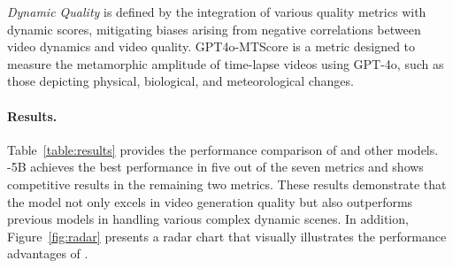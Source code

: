 \emph{Dynamic Quality} is defined by the integration of various quality metrics with dynamic scores, mitigating biases arising from negative correlations between video dynamics and video quality.
GPT4o-MTScore is a metric designed to measure the metamorphic amplitude of time-lapse videos using GPT-4o, such as those depicting physical, biological, and meteorological changes. 



\paragraph{Results.} 
Table~\ref{table:results} provides the performance comparison of \model and other models. 
\model-5B achieves the best performance in five out of the seven metrics and shows competitive results in the remaining two metrics. 
These results demonstrate that the model not only excels in video generation quality but also outperforms previous models in handling various complex dynamic scenes. 
In addition, Figure~\ref{fig:radar} presents a radar chart that visually illustrates the performance advantages of \model.










